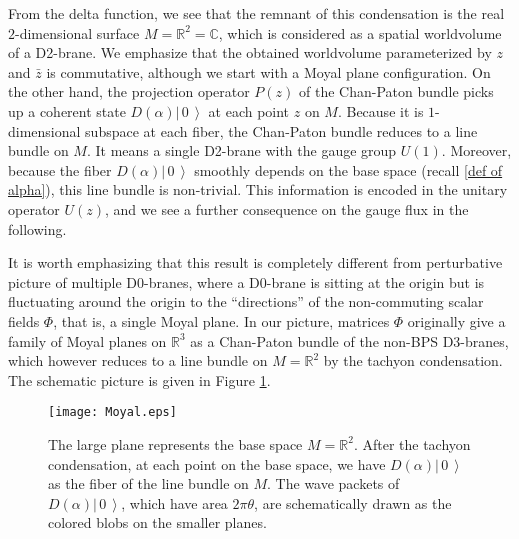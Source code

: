 \documentclass[12pt]{article}
\numberwithin{equation}{section}
\newcommand{\rc}[1]{\textcolor{red}{#1}}
\newcommand{\Ket}[1]{\left|\, #1\,\right\rangle}
\def\real{\mathbb{R}}
\def\complex{\mathbb{C}}
\begin{document}
From the delta function, we see that the remnant of this condensation 
is the real $2$-dimensional surface $M=\real^2=\complex$,
which is considered as a spatial worldvolume of a D2-brane.
We emphasize that the {obtained} worldvolume 
{parameterized by $z$ and $\bar{z}$ is} commutative, 
although we start with a Moyal plane configuration.
On the other hand, the projection operator $P(z)$ of the Chan-Paton bundle
picks up a coherent state $D(\alpha)\Ket{0}$ at each point $z$ on $M$.
Because it is $1$-dimensional subspace at each fiber, the Chan-Paton bundle
reduces to a line bundle on $M$.
It means a single D2-brane with the gauge group $U(1)$.
Moreover, because the fiber $D(\alpha)\Ket{0}$ smoothly depends on the base space 
(recall \eqref{def of alpha}), this line bundle is non-trivial.
This information is encoded in the unitary operator $U(z)$,
and we see a further consequence on the gauge flux in the following. 
  
It is worth emphasizing that this result is completely different from 
perturbative picture of multiple D0-branes,
where a D0-brane is sitting at the origin but 
{is fluctuating around the origin to the ``directions'' of} 
the non-commuting scalar fields $\Phi$, that is, a single Moyal plane.
In our picture, matrices $\Phi$ originally give a family of Moyal planes on $\real^3$
as a Chan-Paton bundle of the non-BPS D3-branes,
which however reduces to a line bundle on $M=\real^2$ by the tachyon condensation.
The schematic picture is given in Figure \ref{fig:Moyal}.

\begin{figure}[h]
\begin{center}
	\texttt{[image: Moyal.eps]}
\caption{\small 
The large plane represents 
the base space $M=\real^2$. After the tachyon condensation, 
at each point on the base space, 
we have $D(\alpha)\Ket{0}$ as the fiber of the line bundle on $M$.
The wave packets of $D(\alpha)\Ket{0}$, which
have area $2\pi \theta$,
are schematically drawn as the colored blobs on the smaller 
planes.
} 
\label{fig:Moyal}
\end{center}
\end{figure}
 
\end{document}
